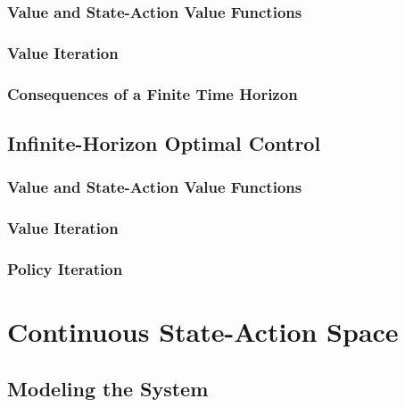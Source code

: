 			\subsubsection{Value and State-Action Value Functions} %

			\subsubsection{Value Iteration} %

			\subsubsection{Consequences of a Finite Time Horizon} %

		\subsection{Infinite-Horizon Optimal Control} %

			\subsubsection{Value and State-Action Value Functions} %

			\subsubsection{Value Iteration} %

			\subsubsection{Policy Iteration} %

	\section{Continuous State-Action Space} %

		\subsection{Modeling the System} %


